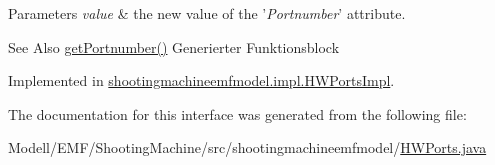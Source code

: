 \begin{DoxyParams}{Parameters}
{\em value} & the new value of the '{\itshape Portnumber}' attribute. \\
\hline
\end{DoxyParams}
\begin{DoxySeeAlso}{See Also}
\hyperlink{interfaceshootingmachineemfmodel_1_1_h_w_ports_adb85d02765e7381807dd4f9e41b14fcc}{get\-Portnumber()} Generierter Funktionsblock 
\end{DoxySeeAlso}


Implemented in \hyperlink{classshootingmachineemfmodel_1_1impl_1_1_h_w_ports_impl_a40d7b9200e07dfa30718e81fdfac76aa}{shootingmachineemfmodel.\-impl.\-H\-W\-Ports\-Impl}.



The documentation for this interface was generated from the following file\-:\begin{DoxyCompactItemize}
\item 
Modell/\-E\-M\-F/\-Shooting\-Machine/src/shootingmachineemfmodel/\hyperlink{_h_w_ports_8java}{H\-W\-Ports.\-java}\end{DoxyCompactItemize}
